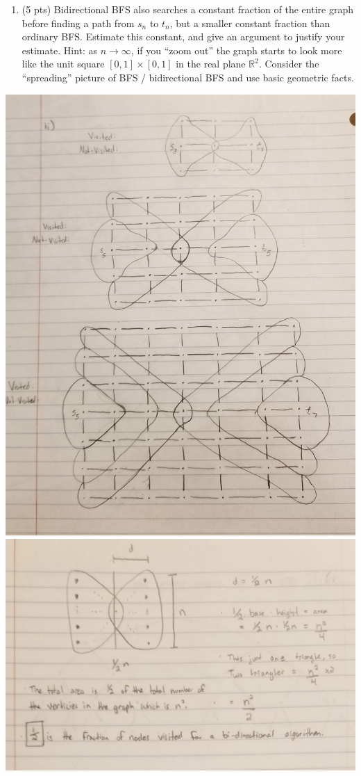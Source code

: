 \documentclass[12pt]{article}
\begin{document}
\begin{enumerate}
\begin{enumerate}
\begin{enumerate}
	\item (5 pts) Bidirectional BFS also searches a constant fraction of the entire graph before finding a path from $s_n$ to $t_n$, but a smaller constant fraction than ordinary BFS. Estimate this constant, and give an argument to justify your estimate. Hint: as $n \to \infty$, if you ``zoom out'' the graph starts to look more like the unit square $[0,1] \times [0,1]$ in the real plane $\mathbb{R}^2$. Consider the ``spreading'' picture of BFS / bidirectional BFS and use basic geometric facts.
	\end{enumerate}
	\begin{minipage}{0.45\textwidth}
\includegraphics[scale=0.10]{problem1cpic2.png}
\includegraphics[scale=0.10]{problem1cpic3.png}

\end{minipage}
\end{enumerate}
\end{enumerate}
\end{document}
